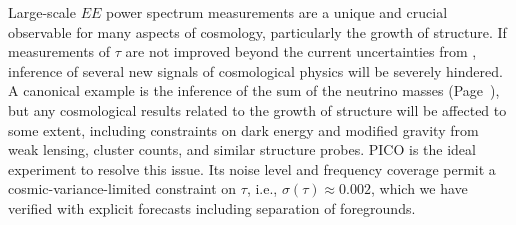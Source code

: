 \documentclass[PICOReport.tex]{subfiles}
\begin{document}

 
Large-scale $EE$ power spectrum measurements are a unique and crucial observable for many aspects of cosmology, particularly the growth of structure.  If measurements of $\tau$ are not improved beyond the current uncertainties from \planck , inference of several new signals of cosmological physics will be severely hindered.  A canonical example is the inference of the sum of the neutrino masses (Page~\pageref{neutrino_fundamental}), but any cosmological results related to the growth of structure will be affected to some extent, including constraints on dark energy and modified gravity from weak lensing, cluster counts, and similar structure probes.  PICO is the ideal experiment to resolve this issue.  Its noise level and frequency coverage permit a cosmic-variance-limited constraint on $\tau$, i.e., $\sigma(\tau) \approx 0.002$, which we have verified with explicit forecasts including separation of foregrounds. 
\end{document}
